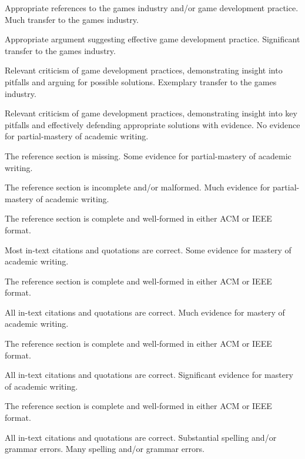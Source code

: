\documentclass{../fal_assignment}
\begin{document}
\begin{markingrubric}
        \par 		Appropriate references to the games industry and/or game development practice. 
        \grade 		Much transfer to the games industry.
        \par 		Appropriate argument suggesting effective game development practice. 
        \grade 		Significant transfer to the games industry.
        \par 		Relevant criticism of game development practices, demonstrating insight into pitfalls and arguing for possible solutions. 
        \grade 		Exemplary transfer to the games industry.
        \par 		Relevant criticism of game development practices, demonstrating insight into key pitfalls and effectively defending appropriate solutions with evidence. 
%
        \grade\fail 	No evidence for partial-mastery of academic writing.
        \par 		The reference section is missing.
        \grade 		Some evidence for partial-mastery of academic writing.
        \par 		The reference section is incomplete and/or malformed.
        \grade 		Much evidence for partial-mastery of academic writing.
        \par 		The reference section is complete and well-formed in either ACM or IEEE format.
        \par 		Most in-text citations and quotations are correct.
        \grade 		Some evidence for mastery of academic writing.
        \par 		The reference section is complete and well-formed in either ACM or IEEE format.
        \par 		All in-text citations and quotations are correct.
        \grade 		Much evidence for mastery of academic writing.
        \par 		The reference section is complete and well-formed in either ACM or IEEE format.
        \par 		All in-text citations and quotations are correct.
        \grade 		Significant evidence for mastery of academic writing.
        \par 		The reference section is complete and well-formed in either ACM or IEEE format.
        \par 		All in-text citations and quotations are correct.
%
        \grade\fail 	Substantial spelling and/or grammar errors.
        \grade 		Many spelling and/or grammar errors.

\end{markingrubric}
\end{document}

